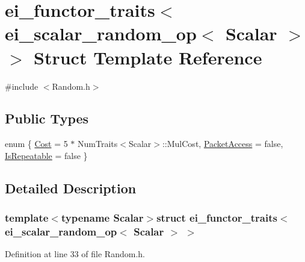 \hypertarget{structei__functor__traits_3_01ei__scalar__random__op_3_01_scalar_01_4_01_4}{\section{ei\-\_\-functor\-\_\-traits$<$ ei\-\_\-scalar\-\_\-random\-\_\-op$<$ Scalar $>$ $>$ Struct Template Reference}
\label{structei__functor__traits_3_01ei__scalar__random__op_3_01_scalar_01_4_01_4}
}


{\ttfamily \#include $<$Random.\-h$>$}

\subsection*{Public Types}
\begin{DoxyCompactItemize}
\item 
enum \{ \hyperlink{structei__functor__traits_3_01ei__scalar__random__op_3_01_scalar_01_4_01_4_a2f02f94e62967537657928887b32e319ab2fa85155b26f8105ec366a4a0d9e075}{Cost} = 5 $\ast$ Num\-Traits$<$Scalar$>$\-:\-:Mul\-Cost, 
\hyperlink{structei__functor__traits_3_01ei__scalar__random__op_3_01_scalar_01_4_01_4_a2f02f94e62967537657928887b32e319a46aea2a73ed28e38a16f62fa13d939e5}{Packet\-Access} = false, 
\hyperlink{structei__functor__traits_3_01ei__scalar__random__op_3_01_scalar_01_4_01_4_a2f02f94e62967537657928887b32e319a7b06521b9655b99ea5d57057bf2a099f}{Is\-Repeatable} = false
 \}
\end{DoxyCompactItemize}


\subsection{Detailed Description}
\subsubsection*{template$<$typename Scalar$>$struct ei\-\_\-functor\-\_\-traits$<$ ei\-\_\-scalar\-\_\-random\-\_\-op$<$ Scalar $>$ $>$}



Definition at line 33 of file Random.\-h.



